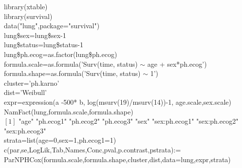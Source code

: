 \documentclass[A4document,12pt]{article}\usepackage[]{graphicx}\usepackage[]{color}
\begin{document}
library(xtable)\\
library(survival)\\
data("lung",package="survival")\\
lung\$sex=lung\$sex-1\\
lung\$status=lung\$status-1\\
lung\$ph.ecog=as.factor(lung\$ph.ecog)\\
formula.scale=as.formula('Surv(time, status) $\sim $ age + sex*ph.ecog')\\
formula.shape=as.formula('Surv(time, status) $\sim $ 1')\\
cluster='ph.karno'\\
dist='Weibull'\\
expr=expression(a -500* b, log(msurv(19)/msurv(14))-1, age.scale,sex.scale)\\
NamFact(lung,formula.scale,formula.shape)\\
$[1]$ "age"   "ph.ecog1"     "ph.ecog2"     "ph.ecog3"     "sex"          "sex:ph.ecog1" "sex:ph.ecog2" "sex:ph.ecog3"\\
strata=list(age=0,sex=1,ph.ecog1=1)\\
c(par,se,LogLik,Tab,Names,Conc,pval,p.contrast,pstrata):=\\
     ParNPHCox(formula.scale,formula.shape,cluster,dist,data=lung,expr,strata)\\
\end{document}
